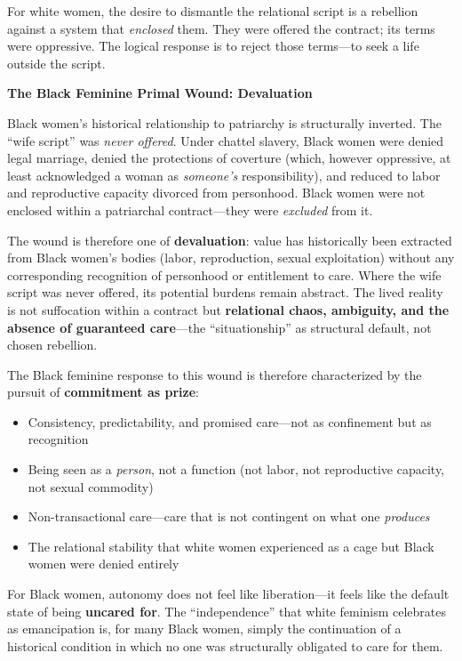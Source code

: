 \documentclass[12pt, letterpaper]{article}
\begin{document}
For white women, the desire to dismantle the relational script is a rebellion against a system that \textit{enclosed} them. They were offered the contract; its terms were oppressive. The logical response is to reject those terms---to seek a life outside the script.

\textbf{The Black Feminine Primal Wound: Devaluation}

Black women's historical relationship to patriarchy is structurally inverted. The ``wife script'' was \textit{never offered}. Under chattel slavery, Black women were denied legal marriage, denied the protections of coverture (which, however oppressive, at least acknowledged a woman as \textit{someone's} responsibility), and reduced to labor and reproductive capacity divorced from personhood. Black women were not enclosed within a patriarchal contract---they were \textit{excluded} from it.

The wound is therefore one of \textbf{devaluation}: value has historically been extracted from Black women's bodies (labor, reproduction, sexual exploitation) without any corresponding recognition of personhood or entitlement to care. Where the wife script was never offered, its potential burdens remain abstract. The lived reality is not suffocation within a contract but \textbf{relational chaos, ambiguity, and the absence of guaranteed care}---the ``situationship'' as structural default, not chosen rebellion.

The Black feminine response to this wound is therefore characterized by the pursuit of \textbf{commitment as prize}:

\begin{itemize}
    \item Consistency, predictability, and promised care---not as confinement but as recognition
    \item Being seen as a \textit{person}, not a function (not labor, not reproductive capacity, not sexual commodity)
    \item Non-transactional care---care that is not contingent on what one \textit{produces}
    \item The relational stability that white women experienced as a cage but Black women were denied entirely
\end{itemize}

For Black women, autonomy does not feel like liberation---it feels like the default state of being \textbf{uncared for}. The ``independence'' that white feminism celebrates as emancipation is, for many Black women, simply the continuation of a historical condition in which no one was structurally obligated to care for them.
\end{document}

